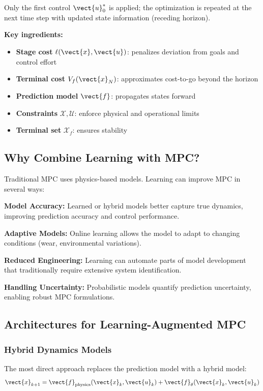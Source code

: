 Only the first control $\vect{u}_0^*$ is applied; the optimization is repeated at the next time step with updated state information (receding horizon).

\textbf{Key ingredients:}
\begin{itemize}
    \item \textbf{Stage cost} $\ell(\vect{x}, \vect{u})$: penalizes deviation from goals and control effort
    \item \textbf{Terminal cost} $V_f(\vect{x}_N)$: approximates cost-to-go beyond the horizon
    \item \textbf{Prediction model} $\vect{f}$: propagates states forward
    \item \textbf{Constraints} $\mathcal{X}, \mathcal{U}$: enforce physical and operational limits
    \item \textbf{Terminal set} $\mathcal{X}_f$: ensures stability
\end{itemize}

\subsection{Why Combine Learning with MPC?}

Traditional MPC uses physics-based models. Learning can improve MPC in several ways:

\textbf{Model Accuracy:} Learned or hybrid models better capture true dynamics, improving prediction accuracy and control performance.

\textbf{Adaptive Models:} Online learning allows the model to adapt to changing conditions (wear, environmental variations).

\textbf{Reduced Engineering:} Learning can automate parts of model development that traditionally require extensive system identification.

\textbf{Handling Uncertainty:} Probabilistic models quantify prediction uncertainty, enabling robust MPC formulations.

\subsection{Architectures for Learning-Augmented MPC}

\subsubsection{Hybrid Dynamics Models}

The most direct approach replaces the prediction model with a hybrid model:
\begin{equation}
\vect{x}_{k+1} = \vect{f}_{\text{physics}}(\vect{x}_k, \vect{u}_k) + \vect{f}_\theta(\vect{x}_k, \vect{u}_k)
\label{eq:hybrid_mpc_model}
\end{equation}

